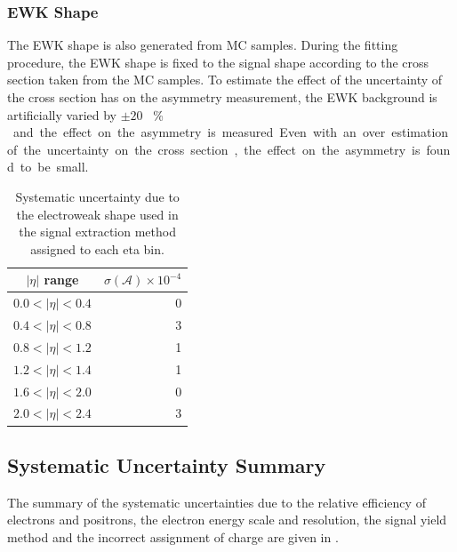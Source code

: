 \subsubsection{\ac{EWK} \ETm Shape}

The \ac{EWK} shape is also generated from \ac{MC} samples. During the fitting
procedure, the \ac{EWK} shape is fixed to the \Wenu signal shape according to
the cross section taken from the \ac{MC} samples. To estimate the effect of the
uncertainty of the cross section has on the asymmetry measurement, the \ac{EWK}
background is artificially varied by \unit{$\pm20$}{ \% } and the effect on the
asymmetry is measured. Even with an over estimation of the uncertainty on the
cross section, the effect on the asymmetry is found to be small.

\begin{table}[htbp]
\begin{center}
\begin{tabular}{cr}
    \toprule
$|\eta|$ range & $\sigma(\mathcal{A}) \times 10^{-4}$\\
\midrule
$0.0<|\eta|<0.4$ & 0\\
$0.4<|\eta|<0.8$ & 3\\
$0.8<|\eta|<1.2$ & 1\\
$1.2<|\eta|<1.4$ & 1\\
$1.6<|\eta|<2.0$ & 0\\
$2.0<|\eta|<2.4$ & 3\\
    \bottomrule
\end{tabular}
\caption{\label{tab:systEWK}Systematic uncertainty due to the electroweak \ETm shape used in the signal extraction method assigned to each eta bin.}
\end{center}
\end{table}


\subsection{Systematic Uncertainty Summary}
The summary of the systematic uncertainties due to the relative efficiency of
electrons and positrons, the electron energy scale and resolution, the signal
yield method and the incorrect assignment of charge are given in
.


